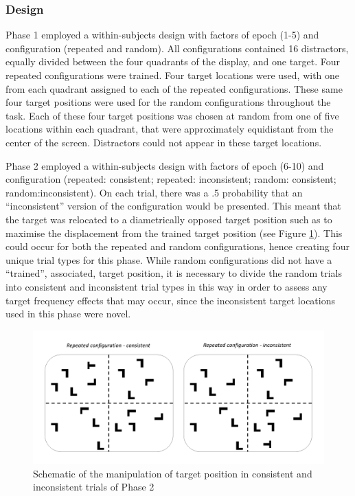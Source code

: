 \documentclass[
  man,floatsintext]{apa7}
\begin{document}
\hypertarget{design}{%
\subsubsection{Design}\label{design}}

Phase 1 employed a within-subjects design with factors of epoch (1-5) and configuration (repeated and random). All configurations contained 16 distractors, equally divided between the four quadrants of the display, and one target. Four repeated configurations were trained. Four target locations were used, with one from each quadrant assigned to each of the repeated configurations. These same four target positions were used for the random configurations throughout the task. Each of these four target positions was chosen at random from one of five locations within each quadrant, that were approximately equidistant from the center of the screen. Distractors could not appear in these target locations.

Phase 2 employed a within-subjects design with factors of epoch (6-10) and configuration (repeated: consistent; repeated: inconsistent; random: consistent; random:inconsistent). On each trial, there was a .5 probability that an ``inconsistent'' version of the configuration would be presented. This meant that the target was relocated to a diametrically opposed target position such as to maximise the displacement from the trained target position (see Figure \ref{fig:schematicCC}). This could occur for both the repeated and random configurations, hence creating four unique trial types for this phase. While random configurations did not have a ``trained'', associated, target position, it is necessary to divide the random trials into consistent and inconsistent trial types in this way in order to assess any target frequency effects that may occur, since the inconsistent target locations used in this phase were novel.



\begin{figure}

{\centering \includegraphics[width=0.75\linewidth]{Schematic} 

}

\caption{Schematic of the manipulation of target position in consistent and inconsistent trials of Phase 2}\label{fig:schematicCC}
\end{figure}
\end{document}
